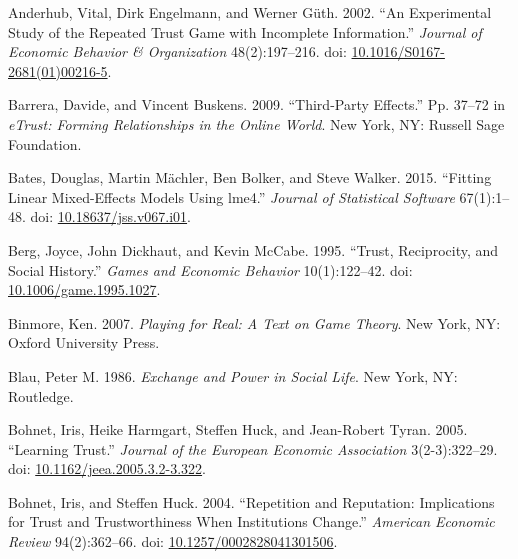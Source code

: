 \documentclass[
  11pt,
]{article}
\newlength{\cslhangindent}
\newlength{\cslentryspacingunit} %
\newenvironment{CSLReferences}[2] %
 {%
  \setlength{\parindent}{0pt}
  \ifodd #1
  \let\oldpar\par
  \def\par{\hangindent=\cslhangindent\oldpar}
  \fi
  \setlength{\parskip}{#2\cslentryspacingunit}
 }%
 {}
\begin{document}
\hypertarget{refs}{}
\begin{CSLReferences}{1}{0}
\leavevmode{}%
Anderhub, Vital, Dirk Engelmann, and Werner Güth. 2002. {``An Experimental Study of the Repeated Trust Game with Incomplete Information.''} \emph{Journal of Economic Behavior \& Organization} 48(2):197--216. doi: \href{https://doi.org/10.1016/S0167-2681(01)00216-5}{10.1016/S0167-2681(01)00216-5}.

\leavevmode{}%
Barrera, Davide, and Vincent Buskens. 2009. {``Third-Party Effects.''} Pp. 37--72 in \emph{eTrust: {F}orming {R}elationships in the {O}nline {W}orld}. New York, NY: Russell Sage Foundation.

\leavevmode{}%
Bates, Douglas, Martin Mächler, Ben Bolker, and Steve Walker. 2015. {``Fitting Linear Mixed-Effects Models Using {lme4}.''} \emph{Journal of Statistical Software} 67(1):1--48. doi: \href{https://doi.org/10.18637/jss.v067.i01}{10.18637/jss.v067.i01}.

\leavevmode{}%
Berg, Joyce, John Dickhaut, and Kevin McCabe. 1995. {``Trust, Reciprocity, and Social History.''} \emph{Games and Economic Behavior} 10(1):122--42. doi: \href{https://doi.org/10.1006/game.1995.1027}{10.1006/game.1995.1027}.

\leavevmode{}%
Binmore, Ken. 2007. \emph{Playing for Real: A Text on Game Theory}. New York, NY: Oxford {U}niversity {P}ress.

\leavevmode{}%
Blau, Peter M. 1986. \emph{Exchange and Power in Social Life}. New York, NY: Routledge.

\leavevmode{}%
Bohnet, Iris, Heike Harmgart, Steffen Huck, and Jean-Robert Tyran. 2005. {``{Learning Trust}.''} \emph{Journal of the European Economic Association} 3(2-3):322--29. doi: \href{https://doi.org/10.1162/jeea.2005.3.2-3.322}{10.1162/jeea.2005.3.2-3.322}.

\leavevmode{}%
Bohnet, Iris, and Steffen Huck. 2004. {``Repetition and Reputation: Implications for Trust and Trustworthiness When Institutions Change.''} \emph{American Economic Review} 94(2):362--66. doi: \href{https://doi.org/10.1257/0002828041301506}{10.1257/0002828041301506}.


\end{CSLReferences}
\end{document}
